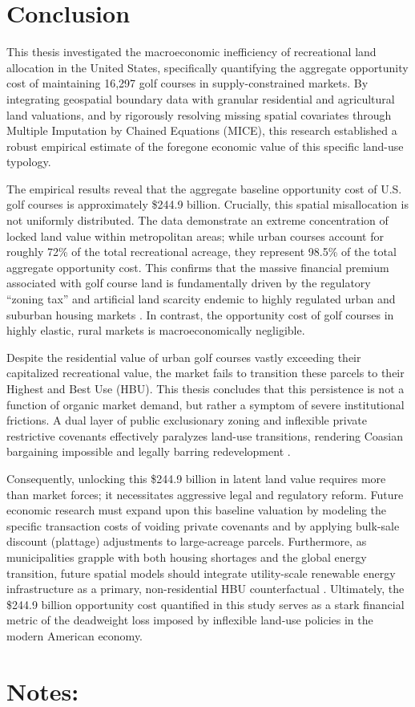 \documentclass[10pt, letterpaper]{article}
\begin{document}
\newpage

\section{Conclusion}

This thesis investigated the macroeconomic inefficiency of recreational land allocation in the United States, specifically quantifying the aggregate opportunity cost of maintaining 16,297 golf courses in supply-constrained markets. By integrating geospatial boundary data with granular residential and agricultural land valuations, and by rigorously resolving missing spatial covariates through Multiple Imputation by Chained Equations (MICE), this research established a robust empirical estimate of the foregone economic value of this specific land-use typology.

The empirical results reveal that the aggregate baseline opportunity cost of U.S. golf courses is approximately \$244.9 billion. Crucially, this spatial misallocation is not uniformly distributed. The data demonstrate an extreme concentration of locked land value within metropolitan areas; while urban courses account for roughly 72\% of the total recreational acreage, they represent 98.5\% of the total aggregate opportunity cost. This confirms that the massive financial premium associated with golf course land is fundamentally driven by the regulatory ``zoning tax'' and artificial land scarcity endemic to highly regulated urban and suburban housing markets \parencite{Glaeser2005, Davis2021}. In contrast, the opportunity cost of golf courses in highly elastic, rural markets is macroeconomically negligible.

Despite the residential value of urban golf courses vastly exceeding their capitalized recreational value, the market fails to transition these parcels to their Highest and Best Use (HBU). This thesis concludes that this persistence is not a function of organic market demand, but rather a symptom of severe institutional frictions. A dual layer of public exclusionary zoning and inflexible private restrictive covenants effectively paralyzes land-use transitions, rendering Coasian bargaining impossible and legally barring redevelopment \parencite{Coase1960, Ellickson2022, Korngold2024}. 

Consequently, unlocking this \$244.9 billion in latent land value requires more than market forces; it necessitates aggressive legal and regulatory reform. Future economic research must expand upon this baseline valuation by modeling the specific transaction costs of voiding private covenants and by applying bulk-sale discount (plattage) adjustments to large-acreage parcels. Furthermore, as municipalities grapple with both housing shortages and the global energy transition, future spatial models should integrate utility-scale renewable energy infrastructure as a primary, non-residential HBU counterfactual \parencite{Weinand2025}. Ultimately, the \$244.9 billion opportunity cost quantified in this study serves as a stark financial metric of the deadweight loss imposed by inflexible land-use policies in the modern American economy.

\newpage

\printbibliography[title={References}]

\newpage
\section*{Notes:}
\end{document}
